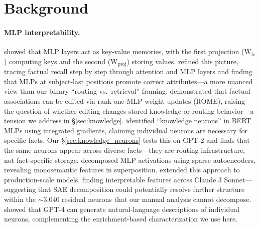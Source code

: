 \documentclass{article}
\begin{document}
\section{Background}

\paragraph{MLP interpretability.}
\citet{geva2021transformer} showed that MLP layers act as key-value memories,
with the first projection (W$_\text{fc}$) computing keys and the second
(W$_\text{proj}$) storing values.
\citet{geva2023dissecting} refined this picture, tracing factual recall
step by step through attention and MLP layers and finding that MLPs at
subject-last positions promote correct attributes---a more nuanced view
than our binary ``routing vs.\ retrieval'' framing.
\citet{meng2022locating} demonstrated that factual associations can be edited
via rank-one MLP weight updates (ROME), raising the question of whether editing
changes stored knowledge or routing behavior---a tension we address in \S\ref{sec:knowledge}.
\citet{dai2022knowledge} identified ``knowledge neurons'' in BERT MLPs using
integrated gradients, claiming individual neurons are necessary for specific
facts. Our \S\ref{sec:knowledge_neurons} tests this on GPT-2 and finds that
the same neurons appear across diverse facts---they are routing infrastructure,
not fact-specific storage.
\citet{bricken2023monosemanticity} decomposed MLP activations using sparse
autoencoders, revealing monosemantic features in superposition.
\citet{templeton2024scaling} extended this approach to production-scale models,
finding interpretable features across Claude 3 Sonnet---suggesting that SAE
decomposition could potentially resolve further structure within
the $\sim$3{,}040 residual neurons that our manual analysis cannot decompose.
\citet{bills2023language} showed that GPT-4 can generate natural-language
descriptions of individual neurons, complementing the enrichment-based
characterization we use here.
\end{document}
